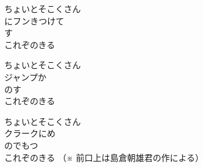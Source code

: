 \documentclass[10pt,b5j]{tarticle} %
\begin{document}
\begin{enumerate}
\begin{minipage}[c]{\blocksize}
        \vspace{\linespace}
        \item
        ちょいとそこくさん\\
        にフンきつけて\\
        す\\
        これぞのきる
        
        \vspace{\linespace}
        \item
        ちょいとそこくさん\\
        ジャンプか\\
        のす\\
        これぞのきる
        
        \vspace{\linespace}
        \item
        ちょいとそこくさん\\
        クラークにめ\\
        のでもつ\\
        これぞのきる
        （※
        前口上は島倉朝雄君の作による）

    
    \end{minipage}
\end{enumerate} %
\end{document}
